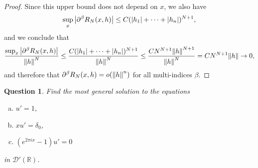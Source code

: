 \documentclass{article}
\theoremstyle{plain}
\newtheorem{question}{Question}
\theoremstyle{remark}
\newcommand{\Bb}{\mathbb}
\newcommand{\Cal}{\mathcal}
\newcommand{\RR}{\Bb R}
\newcommand{\DD}{\Cal D}
\newcommand\pt\partial
\begin{document}
\begin{proof}
Since this upper bound does not depend on $x$, we also have
\[
\sup_x \abs{\pt^\beta R_N(x, h)} \leq C(\abs{h_1} + \dotsb + \abs{h_n})^{N+1}, 
\]
and we conclude that
\[ 
\frac{\sup_x \abs{\pt^\beta R_N(x, h)}}{\norm{h}^N} \leq \frac{C(\abs{h_1} + \dotsb + \abs{h_n})^{N+1}}{\norm{h}^N} \leq \frac{C N^{N+1} \norm{h}^{N+1}}{\norm{h}^N} = CN^{N+1} \norm{h} \to 0, 
\]
and therefore that $\pt^\beta R_N(x, h) = o(\norm{h}^n)$ for all multi-indices $\beta$. 
\end{proof}


\setcounter{question}{3}
\begin{question}
	Find the most general solution to the equations
	\begin{enumerate}[(a)]
		\item $u'  = 1$,
		\item $xu' = \delta_0$,
		\item $(e^{2\pi i x} - 1)u' = 0$
	\end{enumerate}
	in $\DD'(\RR)$. 
\end{question}
\end{document}
